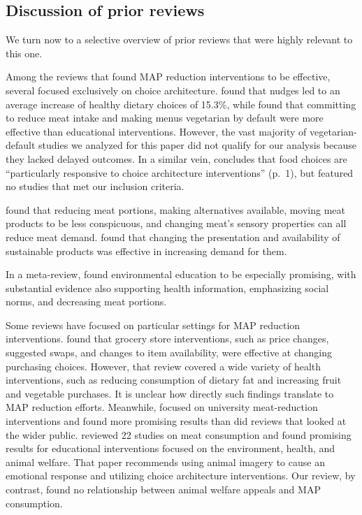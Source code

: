 \documentclass[sn-nature,referee,pdflatex]{sn-jnl}
\begin{document}
\subsection{Discussion of prior
reviews}\label{discussion-of-prior-reviews}

We turn now to a selective overview of prior reviews that were highly
relevant to this one.

Among the reviews that found MAP reduction interventions to be
effective, several focused exclusively on choice architecture.
\citep{arno2016} found that nudges led to an average increase of healthy
dietary choices of 15.3\%, while \citep{byerly2018} found that
committing to reduce meat intake and making menus vegetarian by default
were more effective than educational interventions. However, the vast
majority of vegetarian-default studies we analyzed for this paper did
not qualify for our analysis because they lacked delayed outcomes. In a
similar vein, \citep{mertens2022} concludes that food choices are
``particularly responsive to choice architecture interventions'' (p.~1),
but featured no studies that met our inclusion criteria.

\citep{bianchi2018restructuring} found that reducing meat portions,
making alternatives available, moving meat products to be less
conspicuous, and changing meat's sensory properties can all reduce meat
demand. \citep{pandey2023} found that changing the presentation and
availability of sustainable products was effective in increasing demand
for them.

In a meta-review, \citep{grundy2022} found environmental education to be
especially promising, with substantial evidence also supporting health
information, emphasizing social norms, and decreasing meat portions.

Some reviews have focused on particular settings for MAP reduction
interventions. \citep{hartmannboyce2018} found that grocery store
interventions, such as price changes, suggested swaps, and changes to
item availability, were effective at changing purchasing choices.
However, that review covered a wide variety of health interventions,
such as reducing consumption of dietary fat and increasing fruit and
vegetable purchases. It is unclear how directly such findings translate
to MAP reduction efforts. Meanwhile, \citep{chang2023} focused on
university meat-reduction interventions and found more promising results
than did reviews that looked at the wider public. \citep{harguess2020}
reviewed 22 studies on meat consumption and found promising results for
educational interventions focused on the environment, health, and animal
welfare. That paper recommends using animal imagery to cause an
emotional response and utilizing choice architecture interventions. Our
review, by contrast, found no relationship between animal welfare
appeals and MAP consumption.
\end{document}
